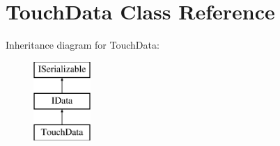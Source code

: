 \hypertarget{class_touch_data}{}\section{Touch\+Data Class Reference}
\label{class_touch_data}
Inheritance diagram for Touch\+Data\+:\begin{figure}[H]
\begin{center}
\leavevmode
\includegraphics[height=3.000000cm]{class_touch_data}
\end{center}
\end{figure}
